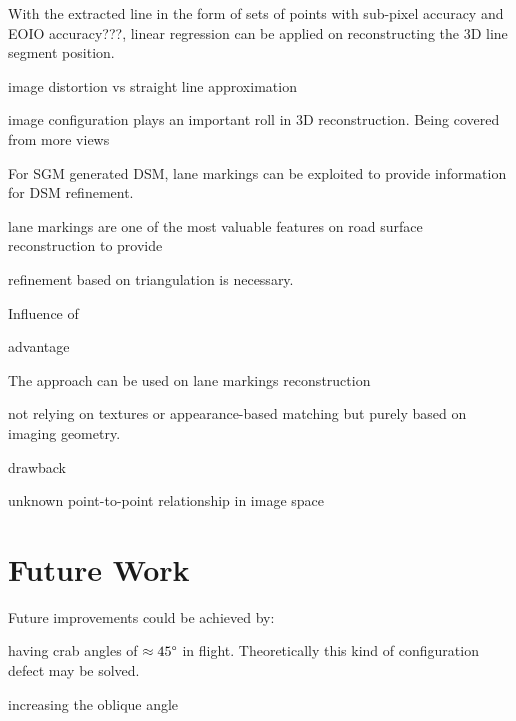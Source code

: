 With the extracted line in the form of sets of points with sub-pixel accuracy and EOIO accuracy???, linear regression can be applied on reconstructing the 3D line segment position.

image distortion vs straight line approximation


image configuration plays an important roll in 3D reconstruction. Being covered from more views



For SGM generated DSM, lane markings can be exploited to provide information for DSM refinement. 

lane markings are one of the most valuable features on road surface reconstruction to provide 

 refinement based on triangulation is necessary.



Influence of 


advantage

The approach can be used on lane markings reconstruction

not relying on textures or appearance-based matching
but purely based on imaging geometry.

drawback

unknown point-to-point relationship in image space




\section*{Future Work}
\label{chap:futurework}

Future improvements could be achieved by:

having crab angles of $\approx45\degree$ in flight.
Theoretically this kind of configuration defect may be solved.

increasing the oblique angle


